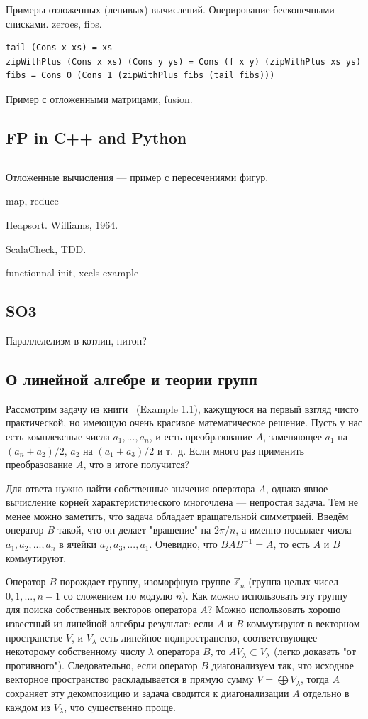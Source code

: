 \documentclass{book}
\begin{document}
Примеры отложенных (ленивых) вычислений. Оперирование бесконечными списками. zeroes, fibs.
\begin{verbatim}
tail (Cons x xs) = xs
zipWithPlus (Cons x xs) (Cons y ys) = Cons (f x y) (zipWithPlus xs ys)
fibs = Cons 0 (Cons 1 (zipWithPlus fibs (tail fibs)))
\end{verbatim}
Пример с отложенными матрицами, fusion.

\subsection{FP in C++ and Python}

\inputminted{cpp}{whyfpmatters.cpp}

Отложенные вычисления --- пример с пересечениями фигур.

map, reduce

Heapsort. Williams, 1964.

ScalaCheck, TDD.

functionnal init, xcels example

\subsection{SO3}

Параллелелизм в котлин, питон?

\subsection{О линейной алгебре и теории групп}

Рассмотрим задачу из книги~\cite{Kirillov08} (Example 1.1), кажущуюся на первый взгляд чисто
практической, но имеющую очень красивое математическое решение. Пусть у нас есть комплексные числа $a_1, ...,
a_n$, и есть преобразование $A$, заменяющее $a_1$ на $(a_n + a_2) / 2$, $a_2$ на $(a_1 + a_3) /
2$ и т.~д. Если много раз применить преобразование $A$, что в итоге получится?

Для ответа нужно найти собственные значения оператора $A$, однако явное вычисление корней
характеристического многочлена --- непростая задача. Тем не менее можно заметить, что задача
обладает вращательной симметрией. Введём оператор $B$ такой, что он делает "вращение" на $2 \pi
/ n$, а именно посылает числа $a_1, a_2, ..., a_n$ в ячейки $a_2, a_3, ..., a_1$. Очевидно, что
$B A B^{-1} = A$, то есть $A$ и $B$ коммутируют.

Оператор $B$ порождает группу, изоморфную группе $\mathbb Z_n$ (группа целых чисел ${0, 1, ..., n -
1}$ со сложением по модулю $n$). Как можно использовать эту группу для поиска собственных
векторов оператора $A$? Можно использовать хорошо известный из линейной алгебры результат: если
$A$ и $B$ коммутируют в векторном пространстве $V$, и $V_\lambda$ есть линейное
подпространство, соответствующее некоторому собственному числу $\lambda$ оператора $B$, то $A
V_\lambda \subset V_\lambda$ (легко доказать "от противного"). Следовательно, если оператор $B$
диагонализуем так, что исходное векторное пространство раскладывается в прямую сумму $V =
\bigoplus V_\lambda$, тогда $A$ сохраняет эту декомпозицию и задача сводится к диагонализации
$A$ отдельно в каждом из $V_\lambda$, что существенно проще.
\end{document}
